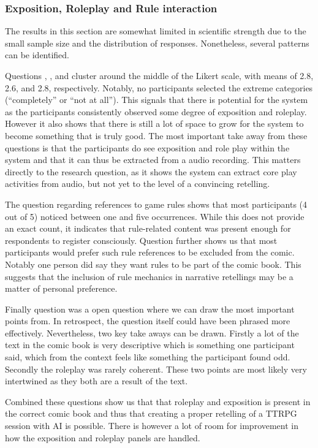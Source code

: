 \subsubsection*{Exposition, Roleplay and Rule interaction}
The results in this section are somewhat limited in scientific strength due to the small sample size and the distribution of responses. Nonetheless, several patterns can be identified. 

Questions , , and  cluster around the middle of the Likert scale, with means of 2.8, 2.6, and 2.8, respectively. Notably, no participants selected the extreme categories (“completely” or “not at all”). This signals that there is potential for the system as the participants consistently observed some degree of exposition and roleplay. However it also shows that there is still a lot of space to grow for the system to become something that is truly good. The most important take away from these questions is that the participants do see exposition and role play within the system and that it can thus be extracted from a audio recording. This matters directly to the research question, as it shows the system can extract core play activities from audio, but not yet to the level of a convincing retelling.

The question regarding references to game rules shows that most participants (4 out of 5) noticed between one and five occurrences. While this does not provide an exact count, it indicates that rule-related content was present enough for respondents to register consciously. Question  further shows us that most participants would prefer such rule references to be excluded from the comic. Notably one person did say they want rules to be part of the comic book. This suggests that the inclusion of rule mechanics in narrative retellings may be a matter of personal preference.

Finally question  was a open question where we can draw the most important points from. In retrospect, the question itself could have been phrased more effectively. Nevertheless, two key take aways can be drawn. Firstly a lot of the text in the comic book is very descriptive which is something one participant said, which from the context feels like something the participant found odd. Secondly the roleplay was rarely coherent. These two points are most likely very intertwined as they both are a result of the text.

Combined these questions show us that that roleplay and exposition is present in the correct comic book and thus that creating a proper retelling of a TTRPG session with AI is possible. There is however a lot of room for improvement in how the exposition and roleplay panels are handled. 


